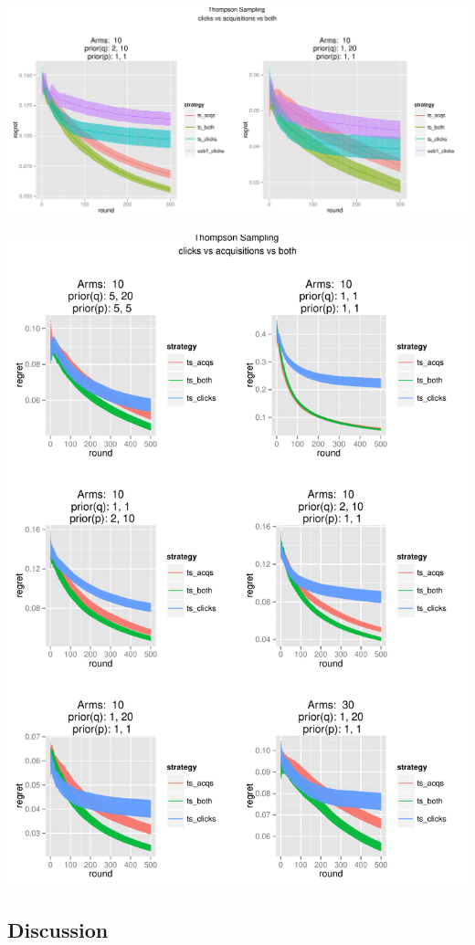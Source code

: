 \documentclass[11pt,a4,singlespacing,titlepagenumber=on]{scrreprt}
\numberwithin{equation}{chapter} %
\theoremstyle{remark}
\begin{document}
\includegraphics[scale=0.5]{P4to5UCB}

\includegraphics[scale=0.7]{P1to6.pdf}

\subsection{Discussion}
\end{document}
